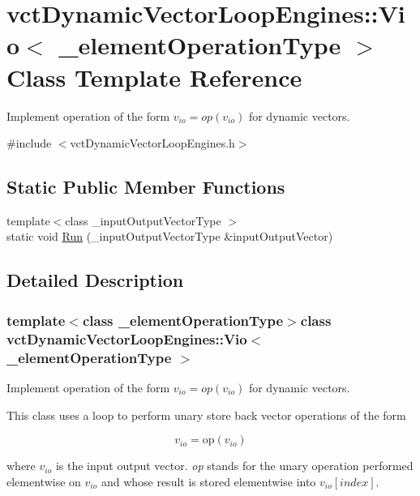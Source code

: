 \hypertarget{classvct_dynamic_vector_loop_engines_1_1_vio}{\section{vct\-Dynamic\-Vector\-Loop\-Engines\-:\-:Vio$<$ \-\_\-element\-Operation\-Type $>$ Class Template Reference}
\label{classvct_dynamic_vector_loop_engines_1_1_vio}
}


Implement operation of the form $v_{io} = op(v_{io})$ for dynamic vectors.  




{\ttfamily \#include $<$vct\-Dynamic\-Vector\-Loop\-Engines.\-h$>$}

\subsection*{Static Public Member Functions}
\begin{DoxyCompactItemize}
\item 
{\footnotesize template$<$class \-\_\-input\-Output\-Vector\-Type $>$ }\\static void \hyperlink{classvct_dynamic_vector_loop_engines_1_1_vio_ab83688c8c6588ee10dcc096a1bf10aa2}{Run} (\-\_\-input\-Output\-Vector\-Type \&input\-Output\-Vector)
\end{DoxyCompactItemize}


\subsection{Detailed Description}
\subsubsection*{template$<$class \-\_\-element\-Operation\-Type$>$class vct\-Dynamic\-Vector\-Loop\-Engines\-::\-Vio$<$ \-\_\-element\-Operation\-Type $>$}

Implement operation of the form $v_{io} = op(v_{io})$ for dynamic vectors. 

This class uses a loop to perform unary store back vector operations of the form

\[ v_{io} = \mathrm{op}(v_{io}) \]

where $v_{io}$ is the input output vector. {\itshape op} stands for the unary operation performed elementwise on $v_{io}$ and whose result is stored elementwise into $v_{io}[index]$.


